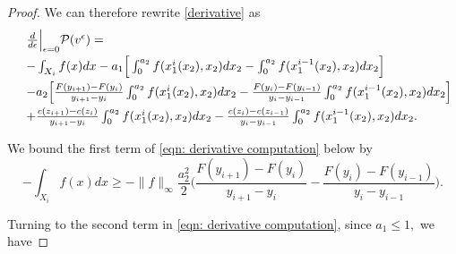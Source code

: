 \documentclass[12pt,reqno]{amsart}
\begin{document}
\begin{proof}
 We can therefore rewrite \eqref{derivative} as 
\begin{equation}\label{eqn: derivative computation}
\begin{array}{ll}
         &\frac{d}{d\epsilon}\Big|_{\epsilon=0} \mathcal P(v^\epsilon)  =\vspace{3pt}\\
         &-\int_{X_i}f(x)dx -a_1\Big[\int_0^{a_2} f(x^i_1(x_2),x_2)dx_2-\int_0^{a_2} f(x_1^{i-1}(x_2),x_2)dx_2\Big] \vspace{3pt}\\
&-a_2\Big[\frac{F(y_{i+1})-F(y_i)}{y_{i+1}-y_{i}} \int_0^{a_2} f(x^i_1(x_2),x_2)dx_2 - \frac{F(y_{i})-F(y_{i-1})}{y_{i}-y_{i-1}}\int_0^{a_2} f(x_1^{i-1}(x_2),x_2)dx_2\Big]      \vspace{3pt}\\
&+     \frac{c(z_{i+1}) -c(z_{i})}{y_{i+1}-y_{i}}\int_0^{a_2} f(x^i_1(x_2),x_2)dx_2 -\frac{c(z_{i}) -c(z_{i-1})}{y_{i}-y_{i-1}}\int_0^{a_2} f(x_1^{i-1}(x_2),x_2)dx_2. 
\end{array}
\end{equation}



We bound the first term of \eqref{eqn: derivative computation} below by 
\begin{equation}\label{X_i mass bound}
-\int_{X_i}f(x)dx\ge -\|f\|_\infty\frac{a_2^2}{2}\Big(\frac{F(y_{i+1})-F(y_i)}{y_{i+1}-y_i}-\frac{F(y_i)-F(y_{i-1})}{y_i-y_{i-1}}\Big).
\end{equation}

Turning to the second term in \eqref{eqn: derivative computation}, since $a_1\le1,$ we have


\end{proof}
\end{document}
